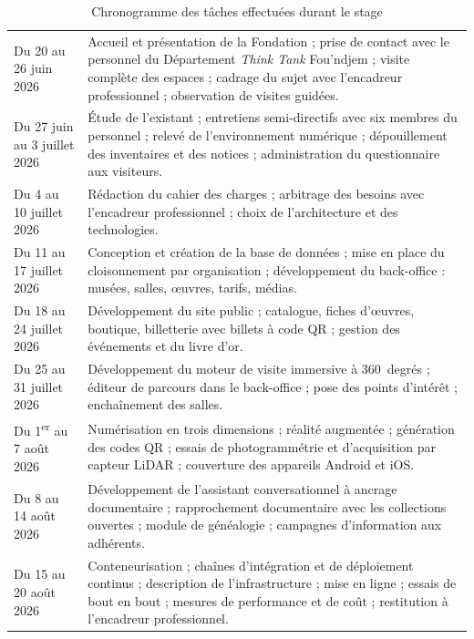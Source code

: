 \begin{table}[htbp]
\centering
\caption{Chronogramme des tâches effectuées durant le stage}
\label{tab:chronogramme}
\footnotesize
\begin{tabularx}{\textwidth}{|L{3.4cm}|X|}
\hline
{}
 &  \\ \hline
Du 20 au 26 juin 2026 &
Accueil et présentation de la Fondation ; prise de contact avec le personnel du
Département \emph{Think Tank} Fou'ndjem ; visite complète des espaces ; cadrage
du sujet avec l'encadreur professionnel ; observation de visites guidées. \\ \hline
Du 27 juin au 3 juillet 2026 &
Étude de l'existant ; entretiens semi-directifs avec six membres du personnel ;
relevé de l'environnement numérique ; dépouillement des inventaires et des
notices ; administration du questionnaire aux visiteurs. \\ \hline
Du 4 au 10 juillet 2026 &
Rédaction du cahier des charges ; arbitrage des besoins avec l'encadreur
professionnel ; choix de l'architecture et des technologies. \\ \hline
Du 11 au 17 juillet 2026 &
Conception et création de la base de données ; mise en place du cloisonnement
par organisation ; développement du back-office : musées, salles, œuvres,
tarifs, médias. \\ \hline
Du 18 au 24 juillet 2026 &
Développement du site public ; catalogue, fiches d'œuvres, boutique,
billetterie avec billets à code QR ; gestion des événements et du livre d'or. \\ \hline
Du 25 au 31 juillet 2026 &
Développement du moteur de visite immersive à 360~degrés ; éditeur de parcours
dans le back-office ; pose des points d'intérêt ; enchaînement des salles. \\ \hline
Du 1\textsuperscript{er} au 7 août 2026 &
Numérisation en trois dimensions ; réalité augmentée ; génération des codes QR ;
essais de photogrammétrie et d'acquisition par capteur LiDAR ; couverture des
appareils Android et iOS. \\ \hline
Du 8 au 14 août 2026 &
Développement de l'assistant conversationnel à ancrage documentaire ;
rapprochement documentaire avec les collections ouvertes ; module de généalogie ;
campagnes d'information aux adhérents. \\ \hline
Du 15 au 20 août 2026 &
Conteneurisation ; chaînes d'intégration et de déploiement continus ;
description de l'infrastructure ; mise en ligne ; essais de bout en bout ;
mesures de performance et de coût ; restitution à l'encadreur professionnel. \\ \hline
\end{tabularx}
\end{table}


